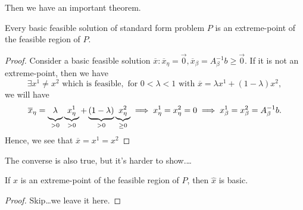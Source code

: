 Then we have an important theorem.
\begin{theorem}
	Every basic feasible solution of standard form problem \(P\) is an extreme-point of the feasible region of \(P\).
\end{theorem}
\begin{proof}
	Consider a basic feasible solution \(\overline{x}: \overline{x}_{\eta} = \vec{0}, \overline{x}_{\beta} = A^{-1}_{\beta}b\geq \vec{0}\).
	If it is not an extreme-point, then we have
	\[
		\exists x^1\neq x^2 \text{ which is feasible}, \text{ for }0<\lambda<1\text{ with }\overline{x} = \lambda x^1 + (1-\lambda)x^2,
	\]
	we will have
	\[
		\overline{x}_{\eta} = \underbrace{\vphantom{x^1_{\eta}}\lambda}_{>0}\underbrace{x^1_{\eta}}_{>0} + \underbrace{\vphantom{x^1_{\eta}}(1-\lambda)}_{>0}\underbrace{x^2_{\eta}}_{\geq 0} \implies x^1_{\eta} = x^2_{\eta} = 0 \implies x^1_{\beta} = x^2_{\beta} = A^{-1}_{\beta}b.
	\]
	Hence, we see that \(\overline{x} = x^1 = x^2\)\conta
\end{proof}

The converse is also true, but it's harder to show.\ldots
\begin{theorem}
	If \(\hat{x}\) is an extreme-point of the feasible region of \(P\), then \(\hat{x}\) is basic.
\end{theorem}
\begin{proof}
	Skip\ldots we leave it here.
\end{proof}


